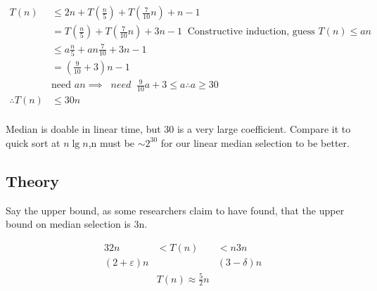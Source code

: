 \documentclass[english, 10pt]{article}
\begin{document}

    \begin{align*}
        T(n) &\le 2n + T(\frac{n}{5})+T(\frac{7}{10}n)+ n - 1  \\
        &= T(\frac{n}{5}) + T(\frac{7}{10}n) + 3n -1 \;\;\text{Constructive induction, guess } T(n) \le an \\
        &\le a\frac{n}{5} + an\frac{7}{10} + 3n -1 \\
        &= \left( \frac{9}{10}+3 \right)n -1 \\
        &\text{need } an \implies \;\;need\;\; \frac{9}{10}a + 3 \le a \therefore a \ge 30 \\
        \therefore T(n) &\le 30n \\
    \end{align*}

    Median is doable in linear time, but 30 is a very large coefficient.
    Compare it to quick sort at $n\lg{n}$,n must be $\sim 2^{30}$ for our
    linear median selection to be better.

\subsection{Theory}
    Say the upper bound, as some researchers claim to have found, that the upper bound on median selection is 3n.

    \begin{alignat*}{3}
        2n &< T(n) &< n 3n \\
        (2+\varepsilon)n && (3-\delta)n \\
        & T(n) \approx \frac{5}{2}n \\
    \end{alignat*}


\end{document}
